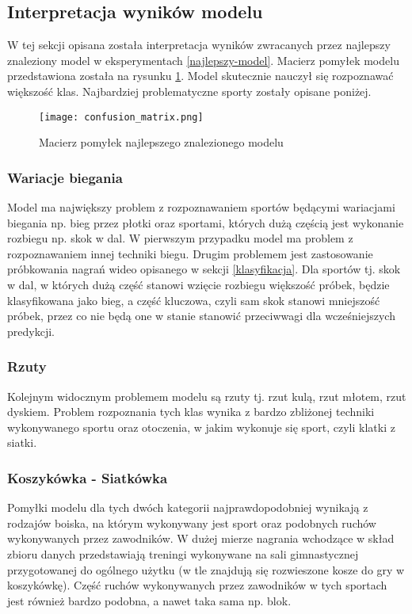\subsection{Interpretacja wyników modelu} 
W tej sekcji opisana została interpretacja wyników zwracanych przez najlepszy znaleziony model w eksperymentach 
\ref{najlepszy-model}. Macierz pomyłek modelu przedstawiona została na rysunku \ref{fig:conf-matrix}. Model skutecznie 
nauczył się rozpoznawać większość klas. Najbardziej problematyczne sporty zostały opisane poniżej.
\begin{figure}[!h]
    \centering \texttt{[image: confusion\_matrix.png]}
    \caption{Macierz pomyłek najlepszego znalezionego modelu}
    \label{fig:conf-matrix}
\end{figure}
\subsubsection{Wariacje biegania} 
Model ma największy problem z rozpoznawaniem sportów będącymi wariacjami biegania np. bieg przez płotki oraz sportami,
których dużą częścią jest wykonanie rozbiegu np. skok w dal. W pierwszym przypadku model ma problem z rozpoznawaniem 
innej techniki biegu. Drugim problemem jest zastosowanie próbkowania nagrań wideo opisanego w sekcji 
\ref{klasyfikacja}. Dla sportów tj. skok w dal, w których dużą część stanowi wzięcie rozbiegu większość próbek, 
będzie klasyfikowana jako bieg, a część kluczowa, czyli sam skok stanowi mniejszość próbek, przez co nie będą one w 
stanie stanowić przeciwwagi dla wcześniejszych predykcji. 
\subsubsection{Rzuty}
Kolejnym widocznym problemem modelu są rzuty tj. rzut kulą, rzut młotem, rzut dyskiem. Problem rozpoznania tych klas 
wynika z bardzo zbliżonej techniki wykonywanego sportu oraz otoczenia, w jakim wykonuje się sport, czyli klatki z siatki. 
\subsubsection{Koszykówka - Siatkówka}
Pomyłki modelu dla tych dwóch kategorii najprawdopodobniej wynikają z rodzajów boiska, 
na którym wykonywany jest sport oraz podobnych ruchów wykonywanych przez zawodników. W dużej mierze nagrania wchodzące 
w skład zbioru danych przedstawiają treningi wykonywane na sali gimnastycznej przygotowanej do ogólnego użytku (w tle 
znajdują się rozwieszone kosze do gry w koszykówkę). Część ruchów wykonywanych przez zawodników w tych sportach jest 
również bardzo podobna, a nawet taka sama np. blok. 